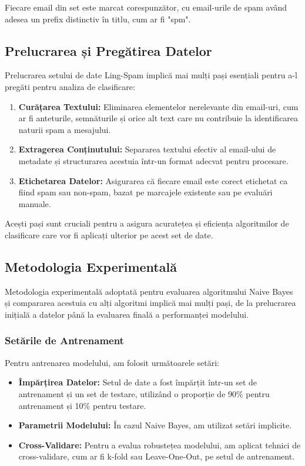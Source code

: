 \documentclass{article}
\begin{document}
Fiecare email din set este marcat corespunzător, cu email-urile de spam având adesea un prefix distinctiv în titlu, cum ar fi "spm".

\subsection{Prelucrarea și Pregătirea Datelor}

Prelucrarea setului de date Ling-Spam implică mai mulți pași esențiali pentru a-l pregăti pentru analiza de clasificare:

\begin{enumerate}
    \item \textbf{Curățarea Textului:} Eliminarea elementelor nerelevante din email-uri, cum ar fi anteturile, semnăturile și orice alt text care nu contribuie la identificarea naturii spam a mesajului.
    \item \textbf{Extragerea Conținutului:} Separarea textului efectiv al email-ului de metadate și structurarea acestuia într-un format adecvat pentru procesare.
    \item \textbf{Etichetarea Datelor:} Asigurarea că fiecare email este corect etichetat ca fiind spam sau non-spam, bazat pe marcajele existente sau pe evaluări manuale.
\end{enumerate}

Acești pași sunt cruciali pentru a asigura acuratețea și eficiența algoritmilor de clasificare care vor fi aplicați ulterior pe acest set de date.

\subsection{Metodologia Experimentală}

Metodologia experimentală adoptată pentru evaluarea algoritmului Naive Bayes și compararea acestuia cu alți algoritmi implică mai mulți pași, de la prelucrarea inițială a datelor până la evaluarea finală a performanței modelului.


\subsubsection{Setările de Antrenament}

Pentru antrenarea modelului, am folosit următoarele setări:
\begin{itemize}
    \item \textbf{Împărțirea Datelor:} Setul de date a fost împărțit într-un set de antrenament și un set de testare, utilizând o proporție de 90\% pentru antrenament și 10\% pentru testare.
    \item \textbf{Parametrii Modelului:} În cazul Naive Bayes, am utilizat setări implicite.
    \item \textbf{Cross-Validare:} Pentru a evalua robustețea modelului, am aplicat tehnici de cross-validare, cum ar fi k-fold sau Leave-One-Out, pe setul de antrenament.
\end{itemize}
\end{document}
